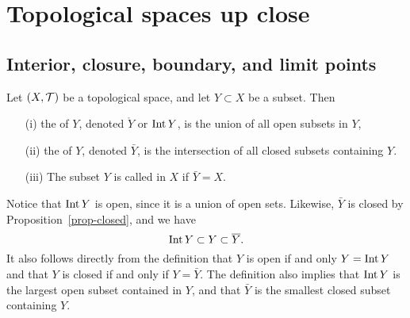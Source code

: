 
\section{Topological spaces up close}
\subsection{Interior, closure, boundary, and limit points}
\begin{defn}
  Let $(X,\mathcal{T})$ be a topological space, and let $Y \subset X$ be a subset. Then
  \begin{enumerate}
    \item[(i)] the  of $Y$, denoted $\mathring{Y}$ or $\operatorname{Int} Y$, is the union of all open subsets in $Y$,
    \item[(ii)] the  of $Y$, denoted $\bar{Y}$, is the intersection of all closed subsets containing $Y$.
    \item[(iii)] The subset $Y$ is called  in $X$ if $\bar{Y} = X$.
  \end{enumerate}
\end{defn}
Notice that $\operatorname{Int} Y$ is open, since it is a union of open sets. Likewise, $\bar Y$ is closed by Proposition~\ref{prop-closed}, and we have
\[
  \operatorname{Int} Y \subset Y \subset \overline{Y}.
\]
It also follows directly from the definition that $Y$ is open if and only $Y = \operatorname{Int} Y$ and that $Y$ is closed if and only if $Y = \bar Y$. The definition also implies that $\operatorname{Int} Y$ is the largest open subset contained in $Y$, and that $\bar Y$ is the smallest closed subset containing $Y$.

